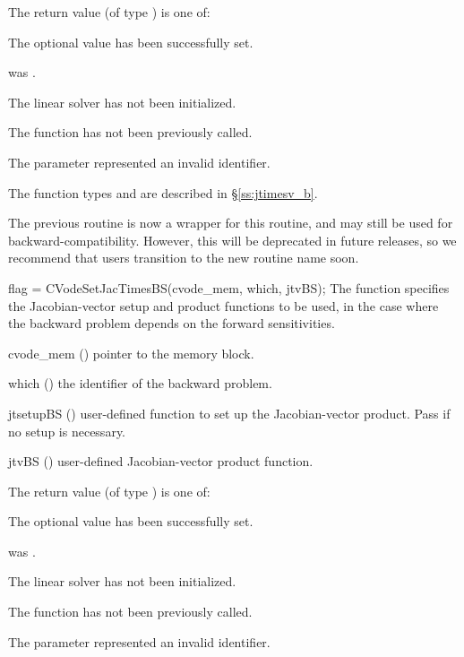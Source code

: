 {
  The return value  (of type ) is one of:
  \begin{args}
  \item[\Id{CVLS\_SUCCESS}]
    The optional value has been successfully set.
  \item[\Id{CVLS\_MEM\_NULL}]
     was .
  \item[\Id{CVLS\_LMEM\_NULL}]
    The {\cvls} linear solver has not been initialized.
  \item[\Id{CVLS\_NO\_ADJ}]
    The function  has not been previously called.
  \item[\Id{CVLS\_ILL\_INPUT}]
    The parameter  represented an invalid identifier.
  \end{args}
}
{
  The function types  and
   are described in \S\ref{ss:jtimesv_b}.

  The previous routine  is now a wrapper for this
  routine, and may still be used for backward-compatibility.  However,
  this will be deprecated in future releases, so we recommend that
  users transition to the new routine name soon.
}
{
  flag = CVodeSetJacTimesBS(cvode\_mem, which, jtvBS);
}
{
  The function  specifies the Jacobian-vector
  setup and product functions to be used, in the case where the backward problem
  depends on the forward sensitivities.
}
{
  \begin{args}
  \item[cvode\_mem] ()
    pointer to the {\cvodes} memory block.
  \item[which] ()
    the identifier of the backward problem.
  \item[jtsetupBS] ()
    user-defined function to set up the Jacobian-vector product.
    Pass  if no setup is necessary.
  \item[jtvBS] ()
    user-defined Jacobian-vector product function.
  \end{args}
}
{
  The return value  (of type ) is one of:
  \begin{args}
  \item[\Id{CVLS\_SUCCESS}]
    The optional value has been successfully set.
  \item[\Id{CVLS\_MEM\_NULL}]
     was .
  \item[\Id{CVLS\_LMEM\_NULL}]
    The {\cvls} linear solver has not been initialized.
  \item[\Id{CVLS\_NO\_ADJ}]
    The function  has not been previously called.
  \item[\Id{CVLS\_ILL\_INPUT}]
    The parameter  represented an invalid identifier.
  \end{args}
}
